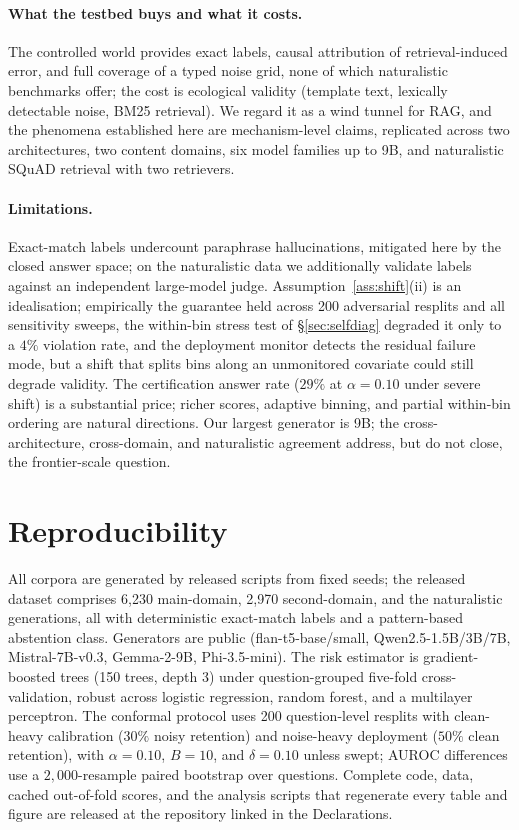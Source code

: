 \documentclass[sn-basic]{sn-jnl}
\theoremstyle{thmstyleone}
\theoremstyle{thmstyletwo}
\begin{document}
\paragraph{What the testbed buys and what it costs.}
The controlled world provides exact labels, causal attribution of
retrieval-induced error, and full coverage of a typed noise grid, none of which
naturalistic benchmarks offer; the cost is ecological validity (template text,
lexically detectable noise, BM25 retrieval). We regard it as a wind tunnel for
RAG, and the phenomena established here are mechanism-level claims, replicated
across two architectures, two content domains, six model families up to 9B, and
naturalistic SQuAD retrieval with two retrievers.

\paragraph{Limitations.}
Exact-match labels undercount paraphrase hallucinations, mitigated here by the
closed answer space; on the naturalistic data we additionally validate labels
against an independent large-model judge. Assumption~\ref{ass:shift}(ii) is an
idealisation; empirically the guarantee held across 200 adversarial resplits and
all sensitivity sweeps, the within-bin stress test of \S\ref{sec:selfdiag}
degraded it only to a $4\%$ violation rate, and the deployment monitor detects
the residual failure mode, but a shift that splits bins along an unmonitored
covariate could still degrade validity. The certification answer rate ($29\%$ at
$\alpha = 0.10$ under severe shift) is a substantial price; richer scores,
adaptive binning, and partial within-bin ordering are natural directions. Our
largest generator is 9B; the cross-architecture, cross-domain, and naturalistic
agreement address, but do not close, the frontier-scale question.

\appendix

\section{Reproducibility}\label{app:repro}
All corpora are generated by released scripts from fixed seeds; the released
dataset comprises 6{,}230 main-domain, 2{,}970 second-domain, and the
naturalistic generations, all with deterministic exact-match labels and a
pattern-based abstention class. Generators are public (flan-t5-base/small,
Qwen2.5-1.5B/3B/7B, Mistral-7B-v0.3, Gemma-2-9B, Phi-3.5-mini). The risk
estimator is gradient-boosted trees (150 trees, depth 3) under
question-grouped five-fold cross-validation, robust across logistic
regression, random forest, and a multilayer perceptron. The conformal
protocol uses 200 question-level resplits with clean-heavy calibration
($30\%$ noisy retention) and noise-heavy deployment ($50\%$ clean
retention), with $\alpha = 0.10$, $B = 10$, and $\delta = 0.10$ unless
swept; AUROC differences use a $2{,}000$-resample paired bootstrap over
questions. Complete code, data, cached out-of-fold scores, and the analysis
scripts that regenerate every table and figure are released at the
repository linked in the Declarations.
\end{document}
